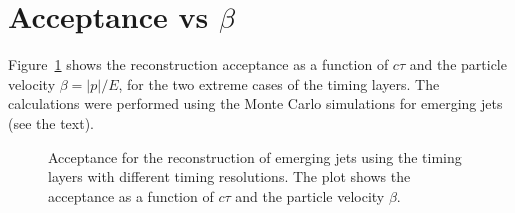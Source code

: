 \section{Acceptance vs $\beta$}
\label{appendix}

Figure~\ref{fig:efficiency_beta} shows the reconstruction
acceptance as a function of $c\tau$ and the  particle velocity  $\beta=|p|/E$, for the two extreme
cases of the timing layers.
The calculations were performed using the Monte Carlo simulations for emerging jets (see the text).

\begin{figure}
\begin{center}

\end{center}
\caption{
Acceptance for the reconstruction of emerging jets using the timing layers with different timing resolutions.
The plot shows the acceptance as a function of $c\tau$ and the  particle velocity $\beta$. 
}
\label{fig:efficiency_beta}
\end{figure}


